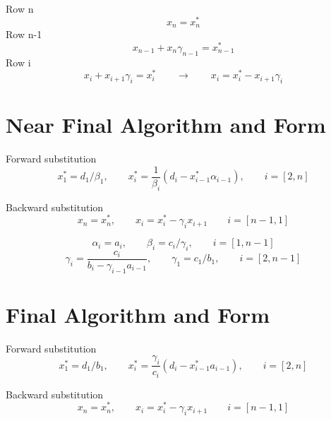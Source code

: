 \documentclass[landscape]{article}
\begin{document}
Row n
\begin{equation}
  x_n = x_n^*
\end{equation}
Row n-1
\begin{equation}
  x_{n-1} + x_n \gamma_{n-1} = x_{n-1}^*
\end{equation}
Row i
\begin{equation}
  x_i + x_{i+1} \gamma_{i} = x_{i}^*
  \qquad \rightarrow \qquad
  x_i = x_i^* - x_{i+1} \gamma_i
\end{equation}




\section{Near Final Algorithm and Form}
Forward substitution
\begin{equation}
  x_1^* = d_1 / \beta_1
  ,\qquad
  x_i^* 
  =
  \frac{1}{\beta_i} (d_i - x_{i-1}^* \alpha_{i-1})
  ,\qquad
  i=[2,n]
\end{equation}

Backward substitution
\begin{equation}
  x_n = x^*_n
  ,\qquad
  x_{i} = x^*_{i} - \gamma_{i} x_{i+1}
  \qquad
  i = [n-1,1]
\end{equation}

\begin{equation}
  \alpha_i = a_i
  ,\qquad
  \beta_i = c_i/\gamma_i
  ,\qquad
  i = [1,n-1]
\end{equation}
\begin{equation}
  \gamma_i
  =
  \frac{c_i}{b_i - \gamma_{i-1} a_{i-1}}
  ,\qquad
  \gamma_1 = c_1/b_1 
  ,\qquad
  i = [2,n-1]
\end{equation}

\section{Final Algorithm and Form}
Forward substitution
\begin{equation}
  x_1^* = d_1 / b_1
  ,\qquad
  x_i^* 
  =
  \frac{\gamma_i}{c_i} (d_i - x_{i-1}^* a_{i-1})
  ,\qquad
  i=[2,n]
\end{equation}

Backward substitution
\begin{equation}
  x_n = x^*_n
  ,\qquad
  x_{i} = x^*_{i} - \gamma_{i} x_{i+1}
  \qquad
  i = [n-1,1]
\end{equation}
\end{document}
